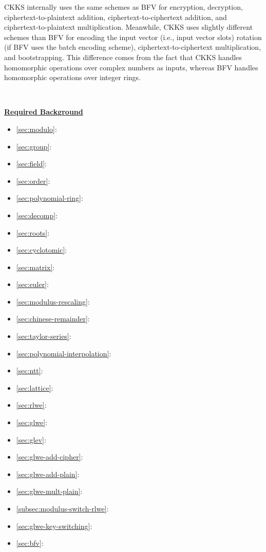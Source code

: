 CKKS internally uses the same schemes as BFV for encryption, decryption, ciphertext-to-plaintext addition, ciphertext-to-ciphertext addition, and ciphertext-to-plaintext multiplication. Meanwhile, CKKS uses slightly different schemes than BFV for encoding the input vector (i.e., input vector slots) rotation (if BFV uses the batch encoding scheme), ciphertext-to-ciphertext multiplication, and bootstrapping. This difference comes from the fact that CKKS handles homomorphic operations over complex numbers as inputs, whereas BFV handles homomorphic operations over integer rings. 


$ $

\noindent \textbf{\underline{Required Background}}

\begin{itemize}
\item \autoref{sec:modulo}: 
\item \autoref{sec:group}: 
\item \autoref{sec:field}: 
\item \autoref{sec:order}: 
\item \autoref{sec:polynomial-ring}: 
\item \autoref{sec:decomp}: 
\item \autoref{sec:roots}: 
\item \autoref{sec:cyclotomic}: 
\item \autoref{sec:matrix}: 
\item \autoref{sec:euler}: 
\item \autoref{sec:modulus-rescaling}: 
\item \autoref{sec:chinese-remainder}: 
\item \autoref{sec:taylor-series}: 
\item \autoref{sec:polynomial-interpolation}: 
\item \autoref{sec:ntt}: 
\item \autoref{sec:lattice}: 
\item \autoref{sec:rlwe}: 
\item \autoref{sec:glwe}: 
\item \autoref{sec:glev}: 
\item \autoref{sec:glwe-add-cipher}: 
\item \autoref{sec:glwe-add-plain}: 
\item \autoref{sec:glwe-mult-plain}: 
\item \autoref{subsec:modulus-switch-rlwe}: 
\item \autoref{sec:glwe-key-switching}: 
\item \autoref{sec:bfv}: 
\end{itemize}




